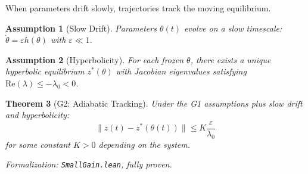 \documentclass[12pt]{article}
\newtheorem{theorem}{Theorem}[section]
\newtheorem{assumption}[theorem]{Assumption}
\begin{document}
When parameters drift slowly, trajectories track the moving equilibrium.

\begin{assumption}[Slow Drift]
Parameters $\theta(t)$ evolve on a slow timescale: $\dot{\theta} = \varepsilon h(\theta)$ with $\varepsilon \ll 1$.
\end{assumption}

\begin{assumption}[Hyperbolicity]
For each frozen $\theta$, there exists a unique hyperbolic equilibrium $z^*(\theta)$ with Jacobian eigenvalues satisfying $\text{Re}(\lambda) \leq -\lambda_0 < 0$.
\end{assumption}

\begin{theorem}[G2: Adiabatic Tracking]
\label{thm:g2}
Under the G1 assumptions plus slow drift and hyperbolicity:
\[
\|z(t) - z^*(\theta(t))\| \leq K \frac{\varepsilon}{\lambda_0}
\]
for some constant $K > 0$ depending on the system.
\end{theorem}
\noindent\textit{Formalization: \texttt{SmallGain.lean}, fully proven.}
\end{document}
